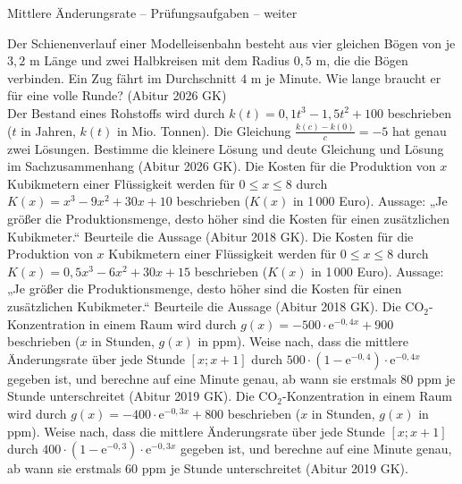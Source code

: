\begin{aufgabe}{Mittlere Änderungsrate – Prüfungsaufgaben – weiter}
\begin{teile}
\teil Der Schienenverlauf einer Modelleisenbahn besteht aus vier gleichen Bögen von je $3{,}2$ m Länge und zwei Halbkreisen mit dem Radius $0{,}5$ m, die die Bögen verbinden. Ein Zug fährt im Durchschnitt $4$ m je Minute. Wie lange braucht er für eine volle Runde? \hfill (Abitur 2026 GK) \\ \leerfeld[min]
\teil Der Bestand eines Rohstoffs wird durch $k(t) = 0{,}1t^3 - 1{,}5t^2 + 100$ beschrieben ($t$ in Jahren, $k(t)$ in Mio. Tonnen). Die Gleichung $\frac{k(c) - k(0)}{c} = -5$ hat genau zwei Lösungen. Bestimme die kleinere Lösung und deute Gleichung und Lösung im Sachzusammenhang \hfill (Abitur 2026 GK).
\teil Die Kosten für die Produktion von $x$ Kubikmetern einer Flüssigkeit werden für $0 \le x \le 8$ durch $K(x) = x^3 - 9x^2 + 30x + 10$ beschrieben ($K(x)$ in 1\,000 Euro). Aussage: „Je größer die Produktionsmenge, desto höher sind die Kosten für einen zusätzlichen Kubikmeter.“ Beurteile die Aussage \hfill (Abitur 2018 GK).
\teil Die Kosten für die Produktion von $x$ Kubikmetern einer Flüssigkeit werden für $0 \le x \le 8$ durch $K(x) = 0{,}5x^3 - 6x^2 + 30x + 15$ beschrieben ($K(x)$ in 1\,000 Euro). Aussage: „Je größer die Produktionsmenge, desto höher sind die Kosten für einen zusätzlichen Kubikmeter.“ Beurteile die Aussage \hfill (Abitur 2018 GK).
\teil Die CO$_2$-Konzentration in einem Raum wird durch $g(x) = -500 \cdot \mathrm{e}^{-0{,}4x} + 900$ beschrieben ($x$ in Stunden, $g(x)$ in ppm). Weise nach, dass die mittlere Änderungsrate über jede Stunde $[x; x + 1]$ durch $500 \cdot (1 - \mathrm{e}^{-0{,}4}) \cdot \mathrm{e}^{-0{,}4x}$ gegeben ist, und berechne auf eine Minute genau, ab wann sie erstmals $80$ ppm je Stunde unterschreitet \hfill (Abitur 2019 GK).
\teil Die CO$_2$-Konzentration in einem Raum wird durch $g(x) = -400 \cdot \mathrm{e}^{-0{,}3x} + 800$ beschrieben ($x$ in Stunden, $g(x)$ in ppm). Weise nach, dass die mittlere Änderungsrate über jede Stunde $[x; x + 1]$ durch $400 \cdot (1 - \mathrm{e}^{-0{,}3}) \cdot \mathrm{e}^{-0{,}3x}$ gegeben ist, und berechne auf eine Minute genau, ab wann sie erstmals $60$ ppm je Stunde unterschreitet \hfill (Abitur 2019 GK).
\end{teile}
\end{aufgabe}

